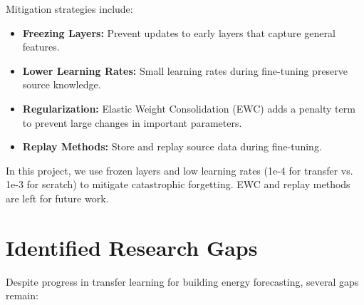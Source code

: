 \documentclass[12pt,a4paper]{report}
\begin{document}
Mitigation strategies include:

\begin{itemize}
    \item \textbf{Freezing Layers:} Prevent updates to early layers that capture general features.
    \item \textbf{Lower Learning Rates:} Small learning rates during fine-tuning preserve source knowledge.
    \item \textbf{Regularization:} Elastic Weight Consolidation (EWC) \cite{kirkpatrick2017overcoming} adds a penalty term to prevent large changes in important parameters.
    \item \textbf{Replay Methods:} Store and replay source data during fine-tuning.
\end{itemize}

In this project, we use frozen layers and low learning rates (1e-4 for transfer vs. 1e-3 for scratch) to mitigate catastrophic forgetting. EWC and replay methods are left for future work.

\section{Identified Research Gaps}

Despite progress in transfer learning for building energy forecasting, several gaps remain:
\end{document}
